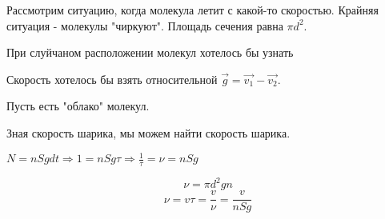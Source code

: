 Рассмотрим ситуацию, когда молекула летит с какой-то скоростью. Крайняя ситуация - молекулы "чиркуют". Площадь сечения равна $\pi d^2$.

При слуйчаном расположении молекул хотелось бы узнать 

Скорость хотелось бы взять относительной $\vec{g} = \vec{v_1} - \vec{v_2}$.

Пусть есть "облако" молекул.

Зная скорость шарика, мы можем найти скорость шарика.

$N = n S g dt \Rightarrow 1 = n S g \tau \Rightarrow \frac{1}{\tau} = \nu = n S g$

\[\nu = \pi d^2 g n\]
\[\nu = v \tau = \frac{v}{\nu} = \frac{v}{nSg}\]

\[\]